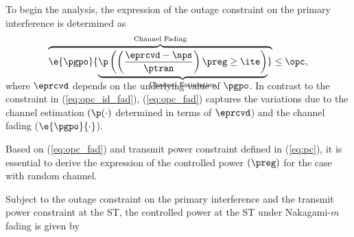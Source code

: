 {To begin the analysis, the expression of the outage constraint on the primary interference is determined as 
\begin{align}
\smash[b]{\overbrace{\e{\pgpo}{\smash[b]{\underbrace{\p\left( \left( \frac{\eprcvd - \nps}{\ptran}\right) \preg \ge \ite \right)}_{\text{Channel Estimation}}}}}^{\text{Channel Fading}}} \le \opc, \label{eq:opc_fad} \\[0.5em] 
\end{align}
where $\eprcvd$ depends on the underlying value of $\pgpo$. In contrast to the constraint in (\ref{eq:opc_id_fad}), (\ref{eq:opc_fad}) captures the variations due to the channel estimation $(\p(\cdot)$ determined in terms of $\eprcvd$) and the channel fading ($\e{\pgpo}{\cdot}$). 

Based on (\ref{eq:opc_fad}) and transmit power constraint defined in (\ref{eq:pc}), it is essential to derive the expression of the controlled power $(\preg)$ for the case with random channel.

\begin{lemma} \label{lm:lm6}
\normalfont
Subject to the outage constraint on the primary interference and the transmit power constraint at the ST, the controlled power at the ST under Nakagami-$m$ fading is given by %


\end{lemma}}
